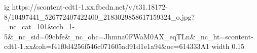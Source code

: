  
 
 
 
 

\par
\ifcmt
  ig https://scontent-cdt1-1.xx.fbcdn.net/v/t31.18172-8/10497441_526772407422400_2183029858617159324_o.jpg?_nc_cat=101&ccb=1-5&_nc_sid=09cbfe&_nc_ohc=Jhmna0FWaM0AX_eqTLn&_nc_ht=scontent-cdt1-1.xx&oh=f41f0d4256f546c071605ad91d1e1a94&oe=614333A1
  width 0.15
\fi

